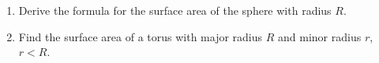 \begin{enumerate}
\item Derive the formula for the surface area of the sphere with radius $R$.
\item Find the surface area of a torus with major radius $R$ and minor radius $r$, $r<R$.

\end{enumerate}